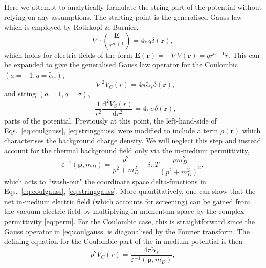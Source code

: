 \documentclass[12pt,a4paper]{article}
\begin{document}
Here we attempt to analytically formulate the string part of the potential without relying on any assumptions. The starting point is the generalised Gauss law which is employed by Rothkopf \& Burnier,
\begin{equation}
\label{eq:gengauss}
\nabla\cdot\left(\frac{\mathbf{E}}{r^{a+1}}\right)=4\pi q\delta\!\left(\mathbf{r}\right),
\end{equation}
which holds for electric fields of the form \(\mathbf{E}\left(\mathbf{r}\right)=-\nabla V\!\left(\mathbf{r}\right)=qr^{a-1}\hat{r}\). This can be expanded to give the generalised Gauss law operator for the Coulombic \(\left(a=-1, q=\tilde{\alpha}_s\right)\),
\begin{equation}
\label{eq:coulgauss}
-\nabla^2V_{C}\!\left(r\right)=4\pi\tilde{\alpha}_s \delta\!\left(\mathbf{r}\right),
\end{equation}
and string \(\left(a=1, q=\sigma\right)\),
\begin{equation}
\label{eq:stringgauss}
-\frac{1}{r^2}\frac{\mathrm{d}^2V_S\!\left(r\right)}{\mathrm{d}r^2}=4\pi\sigma\delta\!\left(\mathbf{r}\right),
\end{equation}
parts of the potential. Previously at this point, the left-hand-side of Eqs.~\ref{eq:coulgauss}, \ref{eq:stringgauss} were modified to include a term \(\rho\!\left(\mathbf{r}\right)\) which characterises the background charge density. We will neglect this step and instead account for the thermal background field only via the in-medium permittivity,
\begin{equation}
\label{eq:perm}
\varepsilon^{-1}\!\left(\mathbf{p},m_{D}\right)=\frac{p^2}{p^2+m_D^2}-i\pi T \frac{p m_D^2}{\left(p^2+m_D^2\right)^2},
\end{equation} 
which acts to ``wash-out" the coordinate space delta-functions in Eqs.~\eqref{eq:coulgauss}, \ref{eq:stringgauss}. More quantitatively, one can show that the net in-medium electric field (which accounts for screening) can be gained from the vacuum electric field by multiplying in momentum space by the complex permittivity \eqref{eq:perm}. For the Coulombic case, this is straightforward since the Gauss operator in \eqref{eq:coulgauss} is diagonalised by the Fourier transform. The defining equation for the Coulombic part of the in-medium potential is then
\begin{equation}
\label{eq:coulgaussp}
p^2 V_C\!\left(r\right)=\frac{4\pi\tilde{\alpha}_s}{\varepsilon^{-1}\!\left(\mathbf{p},m_{D}\right)},
\end{equation}
\end{document}
